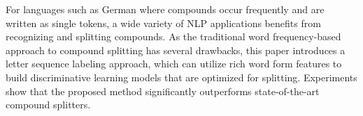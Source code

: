 For languages such as German where compounds occur frequently and are written as single tokens, a wide variety of NLP applications benefits from recognizing and splitting compounds. As the traditional word frequency-based approach to compound splitting has several drawbacks, this paper introduces a letter sequence labeling approach, which can utilize rich word form features to build discriminative learning models that are optimized for splitting. Experiments show that the proposed method significantly outperforms state-of-the-art compound splitters.

